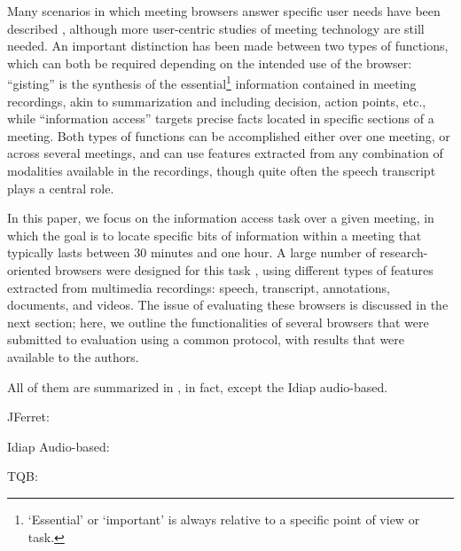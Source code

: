 \documentclass[11pt]{article}
\begin{document}
Many scenarios in which meeting browsers answer specific user needs have been described \cite{tucker-whittaker-mlmi04,lisowska-lrec04,nijholt2006,whittaker-puc08}, although more user-centric studies of meeting technology are still needed.  An important distinction has been made between two types of functions, which can both be required depending on the intended use of the browser: ``gisting'' is the synthesis of the essential\footnote{`Essential' or `important' is always relative to a specific point of view or task.} information contained in meeting recordings, akin to summarization and including decision, action points, etc., while ``information access'' targets precise facts located in specific sections of a meeting.  Both types of functions can be accomplished either over one meeting, or across several meetings, and can use features extracted from any combination of modalities available in the recordings, though quite often the speech transcript plays a central role.


In this paper, we focus on the information access task over a given meeting, in which the goal is to locate specific bits of information within a meeting that typically lasts between 30 minutes and one hour.  A large number of research-oriented browsers were designed for this task \cite{lalanne-im2browsers05,whittaker-puc08}, using different types of features extracted from multimedia recordings: speech, transcript, annotations, documents, and videos.  The issue of evaluating these browsers is discussed in the next section; here, we outline the functionalities of several browsers that were submitted to evaluation using a common protocol, with results that were available to the authors.

All of them are summarized in \cite{lalanne-im2browsers05}, in fact, except the Idiap audio-based.

JFerret: \cite{ferret-mlmi-04,wellner-chi05}

Idiap Audio-based: \cite{ami-d64,popescubelis-mlmi07}

TQB: \cite{popescubelis-lrec06,popescubelis-mlmi07}
\end{document}
